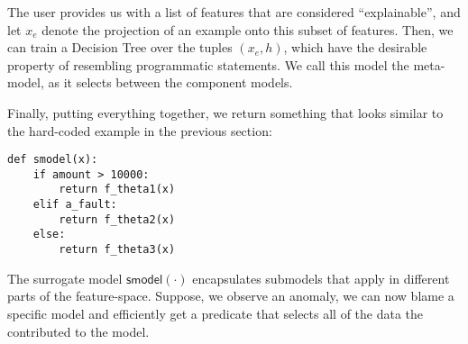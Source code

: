The user provides us with a list of features that are considered ``explainable'', and let $x_e$ denote the projection of an example onto this subset of features.
Then, we can train a Decision Tree over the tuples $(x_e, h)$, which have the desirable property of resembling programmatic statements.
We call this model the meta-model, as it selects between the component models.

Finally, putting everything together, we return something that looks similar to the hard-coded example in the previous section:
\begin{lstlisting}
def smodel(x):
    if amount > 10000:
        return f_theta1(x)
    elif a_fault:
        return f_theta2(x)
    else:
        return f_theta3(x)
\end{lstlisting}
The surrogate model $\textsf{smodel}(\cdot)$ encapsulates submodels that apply in different parts of the feature-space.
Suppose, we observe an anomaly, we can now blame a specific model and efficiently get a predicate that selects all of the data the contributed to the model.